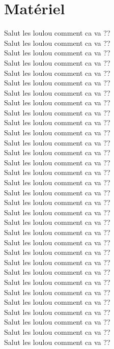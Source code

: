 \section{Matériel}
Salut les loulou comment ca va ??\\
Salut les loulou comment ca va ??\\
Salut les loulou comment ca va ??\\
Salut les loulou comment ca va ??\\
Salut les loulou comment ca va ??\\
Salut les loulou comment ca va ??\\
Salut les loulou comment ca va ??\\
Salut les loulou comment ca va ??\\
Salut les loulou comment ca va ??\\
Salut les loulou comment ca va ??\\
Salut les loulou comment ca va ??\\
Salut les loulou comment ca va ??\\
Salut les loulou comment ca va ??\\
Salut les loulou comment ca va ??\\
Salut les loulou comment ca va ??\\
Salut les loulou comment ca va ??\\
Salut les loulou comment ca va ??\\
Salut les loulou comment ca va ??\\
Salut les loulou comment ca va ??\\
Salut les loulou comment ca va ??\\
Salut les loulou comment ca va ??\\
Salut les loulou comment ca va ??\\
Salut les loulou comment ca va ??\\
Salut les loulou comment ca va ??\\
Salut les loulou comment ca va ??\\
Salut les loulou comment ca va ??\\
Salut les loulou comment ca va ??\\
Salut les loulou comment ca va ??\\
Salut les loulou comment ca va ??\\
Salut les loulou comment ca va ??\\
Salut les loulou comment ca va ??\\
Salut les loulou comment ca va ??\\
